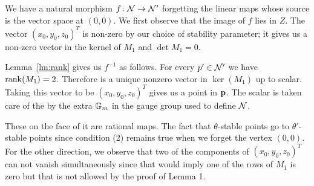 \documentclass{amsart}
\theoremstyle{definition}
\begin{document}
We have a natural morphism $f \colon \mathcal{N} \rightarrow \mathcal{N}'$ forgetting the linear maps whose source is the vector space at $(0,0)$.
We first observe that the image of $f$ lies in $Z$.
The vector $(x_0, y_0, z_0)^T$ is non-zero by our choice of stability parameter; it gives us a non-zero vector in the kernel of $M_1$ and $\det M_1 = 0$.

Lemma~\ref{lm:rank} gives us $f^{-1}$ as follows. 
For every $p' \in \mathcal{N}'$ we have $\operatorname{rank}(M_1)=2$.
Therefore is a unique nonzero vector in $\ker(M_1)$ up to scalar.
Taking this vector to be $(x_0, y_0, z_0)^T$ gives us a point in $\mathbf{p}$.
The scalar is taken care of the by the extra $\mathbb{G}_m$ in the gauge group used to define $\mathcal{N}$.

These on the face of it are rational maps.
The fact that $\theta$-stable points go to $\theta'$-stable points since condition (2) remains true when we forget the vertex $(0,0)$.
For the other direction, we observe that two of the components of $(x_0, y_0, z_0)^T$ can not vanish simultaneously since that would imply one of the rows of $M_1$ is zero but that is not allowed by the proof of Lemma 1.
\end{document}
